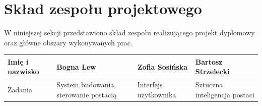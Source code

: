 \section{Skład zespołu projektowego}
W niniejszej sekcji przedstawiono skład zespołu realizującego projekt dyplomowy oraz główne obszary wykonywanych prac.
\begin{center}
  \begin{tabular}{ | m{10em} || m{10em} | m{10em} | m{10em} | }
  \hline
    Imię i nazwisko & Bogna Lew & Zofia Sosińska & Bartosz Strzelecki \\
  \hline\hline
    Zadania & System budowania, sterowanie postacią & Interfejs użytkownika & Sztuczna inteligencja postaci\\
  \hline
  \end{tabular}
\end{center}
